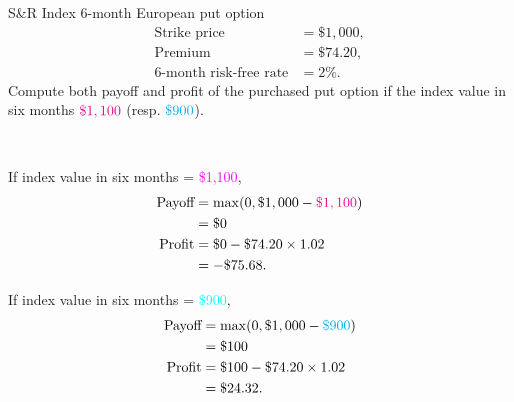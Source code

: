 \begin{frame}[fragile,t]
	\begin{myexample}
		 S\&R Index 6-month European put option
		 \begin{align*}
			 \text{Strike price}           & = \$1,000, \\
			 \text{Premium}                & = \$74.20, \\
			 \text{6-month risk-free rate} & = 2\%.
		 \end{align*}
		 Compute both payoff and profit of the \textcolor{alert}{purchased} put option if the index
		 value in six months $\textcolor{magenta}{\$1,100}$ (resp.  $\textcolor{cyan}{\$900}$).
	\end{myexample}
	\bigskip
	\pause
	\begin{mysol}\phantom{a}\\[1em]

	 \begin{minipage}{0.48\textwidth}
		\begin{center}
			If index value in six months = \textcolor{magenta}{\$1,100},
			\begin{align*}
				\text{Payoff} & = \max ( 0, \$1,000 - \textcolor{magenta}{\$1,100}) \\
                      & = \$0                                               \\
				\text{Profit} & = \$0 - \$74.20 \times 1.02                         \\
                      & = - \$75.68.
			\end{align*}
		\end{center}
	 \end{minipage}
	 \hfill \pause
	 \begin{minipage}{0.48\textwidth}
		\begin{center}
			If index value in six months = \textcolor{cyan}{\$900},
			\begin{align*}
				\text{Payoff} & = \max ( 0, \$1,000 - \textcolor{cyan}{\$900} ) \\
                      & = \$100                                           \\
				\text{Profit} & = \$100 - \$74.20 \times 1.02                     \\
                      & = \$24.32.
			\end{align*}
		\end{center}
	 \end{minipage}

	 \myEnd
	\end{mysol}
\end{frame}
